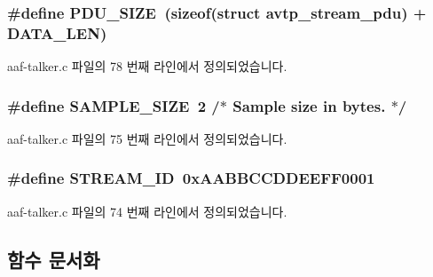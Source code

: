 \subsubsection[{\texorpdfstring{P\+D\+U\+\_\+\+S\+I\+ZE}{PDU_SIZE}}]{\setlength{\rightskip}{0pt plus 5cm}\#define P\+D\+U\+\_\+\+S\+I\+ZE~(sizeof(struct {\bf avtp\+\_\+stream\+\_\+pdu}) + {\bf D\+A\+T\+A\+\_\+\+L\+EN})}\hypertarget{aaf-talker_8c_a4bdc13655ee7bf4cf0e66d16e22dc103}{}\label{aaf-talker_8c_a4bdc13655ee7bf4cf0e66d16e22dc103}


aaf-\/talker.\+c 파일의 78 번째 라인에서 정의되었습니다.

\subsubsection[{\texorpdfstring{S\+A\+M\+P\+L\+E\+\_\+\+S\+I\+ZE}{SAMPLE_SIZE}}]{\setlength{\rightskip}{0pt plus 5cm}\#define S\+A\+M\+P\+L\+E\+\_\+\+S\+I\+ZE~2 /$\ast$ Sample {\bf size} {\bf in} bytes. $\ast$/}\hypertarget{aaf-talker_8c_ae25e0da7cdb20c758a56dc6aece92ba7}{}\label{aaf-talker_8c_ae25e0da7cdb20c758a56dc6aece92ba7}


aaf-\/talker.\+c 파일의 75 번째 라인에서 정의되었습니다.

\subsubsection[{\texorpdfstring{S\+T\+R\+E\+A\+M\+\_\+\+ID}{STREAM_ID}}]{\setlength{\rightskip}{0pt plus 5cm}\#define S\+T\+R\+E\+A\+M\+\_\+\+ID~0x\+A\+A\+B\+B\+C\+C\+D\+D\+E\+E\+F\+F0001}\hypertarget{aaf-talker_8c_ade86a80a3d067dece1f7e7cf957e3e92}{}\label{aaf-talker_8c_ade86a80a3d067dece1f7e7cf957e3e92}


aaf-\/talker.\+c 파일의 74 번째 라인에서 정의되었습니다.



\subsection{함수 문서화}
